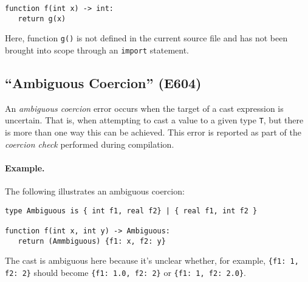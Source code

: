 \begin{lstlisting}
function f(int x) -> int:
   return g(x)
\end{lstlisting}

Here, function \lstinline{g()} is not defined in the current source file and has not been brought into scope through an \lstinline{import} statement.

\subsection{``Ambiguous Coercion'' (E604)}

An {\em ambiguous coercion} error occurs when the target of a cast expression is uncertain.  That is, when attempting to cast a value to a given type \lstinline{T}, but there is more than one way this can be achieved.  This error is reported as part of the {\em coercion check} performed during compilation.

\paragraph{Example.}  The following illustrates an ambiguous coercion:

\begin{lstlisting}
type Ambiguous is { int f1, real f2} | { real f1, int f2 }

function f(int x, int y) -> Ambiguous:
   return (Ammbiguous) {f1: x, f2: y}
\end{lstlisting}

The cast is ambiguous here because it's unclear whether, for example, \lstinline|{f1: 1, f2: 2}| should become \lstinline|{f1: 1.0, f2: 2}| or \lstinline|{f1: 1, f2: 2.0}|.

